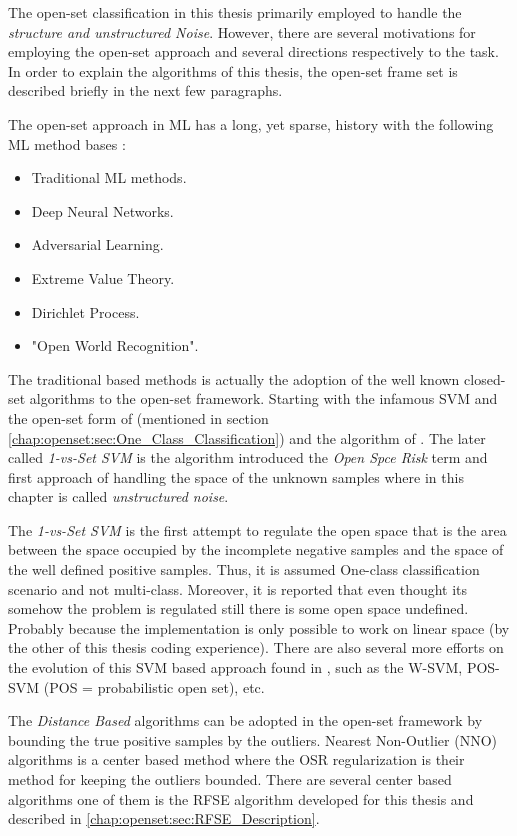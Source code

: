The open-set classification in this thesis primarily employed to handle the \textit{structure and unstructured Noise}. However, there are several motivations for employing the open-set approach and several directions respectively to the task. In order to explain the algorithms of this thesis, the open-set frame set is described briefly in the next few paragraphs.

The open-set approach in ML has a long, yet sparse, history with the following ML method bases \parencite{geng2018recent}:

\begin{itemize}
    \item Traditional ML methods.
    \item Deep Neural Networks.
    \item Adversarial Learning.
    \item Extreme Value Theory.
    \item Dirichlet Process.
    \item "Open World Recognition".
\end{itemize}

The traditional based methods is actually the adoption of the well known closed-set algorithms to the open-set framework. Starting with the infamous SVM and the open-set form of \parencite{manevitz2002one} (mentioned in section \ref{chap:openset:sec:One_Class_Classification}) and the algorithm of \parencite{scheirer2013toward}. The later called \textit{1-vs-Set SVM} is the algorithm introduced the \textit{Open Spce Risk} term and first approach of handling the space of the unknown samples where in this chapter is called \textit{unstructured noise}. 

The \textit{1-vs-Set SVM} is the first attempt to regulate the open space that is the area between the space occupied by the incomplete negative samples and the space of the well defined positive samples. Thus, it is assumed One-class classification scenario and not multi-class. Moreover, it is reported that even thought its somehow the problem is regulated still there is some open space undefined. Probably because the implementation is only possible to work on linear space (by the other of this thesis coding experience). There are also several more efforts on the evolution of this SVM based approach found in \parencite{geng2018recent}, such as the W-SVM, POS-SVM (POS = probabilistic open set), etc.

The \textit{Distance Based} algorithms can be adopted in the open-set framework by bounding the true positive samples by the outliers. Nearest Non-Outlier (NNO) algorithms is a center based method where the OSR regularization is their method for keeping the outliers bounded. There are several center based algorithms one of them is the RFSE algorithm developed for this thesis and described in \ref{chap:openset:sec:RFSE_Description}. 

